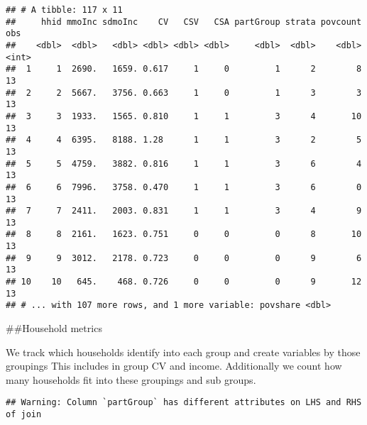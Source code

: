 \documentclass[
]{article}
\newenvironment{Shaded}{\begin{snugshade}}{\end{snugshade}}
\newcommand{\DataTypeTok}[1]{\textcolor[rgb]{0.13,0.29,0.53}{#1}}
\newcommand{\KeywordTok}[1]{\textcolor[rgb]{0.13,0.29,0.53}{\textbf{#1}}}
\newcommand{\NormalTok}[1]{#1}
\newcommand{\OperatorTok}[1]{\textcolor[rgb]{0.81,0.36,0.00}{\textbf{#1}}}
\newcommand{\StringTok}[1]{\textcolor[rgb]{0.31,0.60,0.02}{#1}}
\begin{document}
\begin{verbatim}
## # A tibble: 117 x 11
##     hhid mmoInc sdmoInc    CV   CSV   CSA partGroup strata povcount   obs
##    <dbl>  <dbl>   <dbl> <dbl> <dbl> <dbl>     <dbl>  <dbl>    <dbl> <int>
##  1     1  2690.   1659. 0.617     1     0         1      2        8    13
##  2     2  5667.   3756. 0.663     1     0         1      3        3    13
##  3     3  1933.   1565. 0.810     1     1         3      4       10    13
##  4     4  6395.   8188. 1.28      1     1         3      2        5    13
##  5     5  4759.   3882. 0.816     1     1         3      6        4    13
##  6     6  7996.   3758. 0.470     1     1         3      6        0    13
##  7     7  2411.   2003. 0.831     1     1         3      4        9    13
##  8     8  2161.   1623. 0.751     0     0         0      8       10    13
##  9     9  3012.   2178. 0.723     0     0         0      9        6    13
## 10    10   645.    468. 0.726     0     0         0      9       12    13
## # ... with 107 more rows, and 1 more variable: povshare <dbl>
\end{verbatim}

\#\#Household metrics

We track which households identify into each group and create variables
by those groupings This includes in group CV and income. Additionally we
count how many households fit into these groupings and sub groups.

\begin{Shaded}
\end{Shaded}

\begin{verbatim}
## Warning: Column `partGroup` has different attributes on LHS and RHS of join
\end{verbatim}
\end{document}
